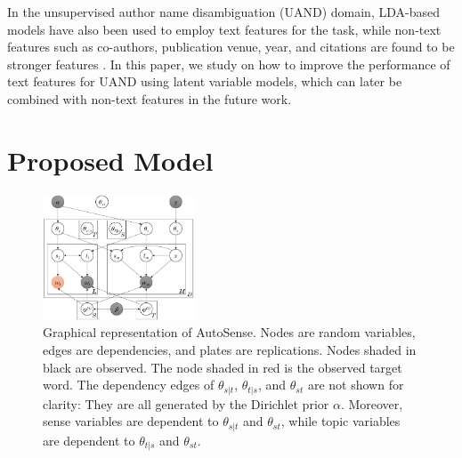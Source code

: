 \documentclass[letterpaper]{article} %
\begin{document}
In the unsupervised author name disambiguation (UAND) domain, LDA-based models have also been used \cite{shu2009latent} to employ text features for the task, while non-text features such as co-authors, publication venue, year, and citations are found to be stronger features \cite{tang2012unified}. In this paper, we study on how to improve the performance of text features for UAND using latent variable models, which can later be combined with non-text features in the future work.

\section{Proposed Model}
%
\begin{figure}[t]
    \centering
    \includegraphics[width=0.4\textwidth]{wpstm}
    \caption{Graphical representation of AutoSense. Nodes are random variables, edges are dependencies, and plates are replications. Nodes shaded in black are observed. The node shaded in red is the observed target word. The dependency edges of $\theta_{s|t}$, $\theta_{t|s}$, and $\theta_{st}$ are not shown for clarity: They are all generated by the Dirichlet prior $\alpha$. Moreover, sense variables are dependent to $\theta_{s|t}$ and $\theta_{st}$, while topic variables are dependent to $\theta_{t|s}$ and $\theta_{st}$.}
    \label{fig:condsptm}
\end{figure}
%
\end{document}
